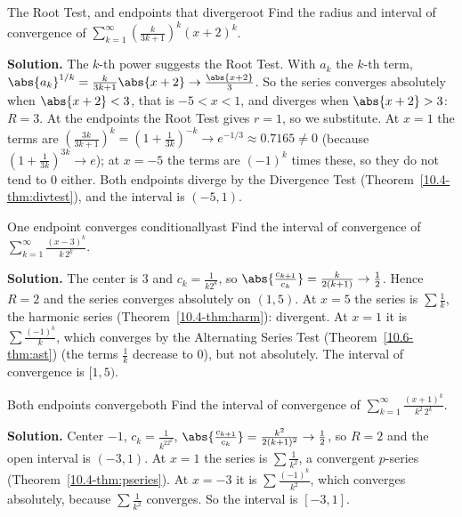 \documentclass[11pt]{article}
\begin{document}
\begin{exmp}{The Root Test, and endpoints that diverge}{root}
Find the radius and interval of convergence of $\displaystyle\sum_{k=1}^\infty\left(\frac k{3k+1}\right)^k(x+2)^k$.

\textbf{Solution.} The $k$-th power suggests the Root Test. With $a_k$ the $k$-th term, $\abs{a_k}^{1/k}=\frac k{3k+1}\abs{x+2}\to\frac{\abs{x+2}}3$.
So the series converges absolutely when $\abs{x+2}<3$, that is $-5<x<1$, and diverges when $\abs{x+2}>3$: $R=3$. At the endpoints the Root Test gives $r=1$, so we substitute. At $x=1$ the terms are $\left(\frac{3k}{3k+1}\right)^k=\left(1+\frac1{3k}\right)^{-k}\to e^{-1/3}\approx0.7165\ne0$ (because $\left(1+\frac1{3k}\right)^{3k}\to e$); at $x=-5$ the terms are $(-1)^k$ times these, so they do not tend to $0$ either. Both endpoints diverge by the Divergence Test (Theorem~\ref{10.4-thm:divtest}), and the interval is $(-5,1)$.
\end{exmp}

\begin{exmp}{One endpoint converges conditionally}{ast}
Find the interval of convergence of $\displaystyle\sum_{k=1}^\infty\frac{(x-3)^k}{k\,2^k}$.

\textbf{Solution.} The center is $3$ and $c_k=\frac1{k2^k}$, so $\abs{\frac{c_{k+1}}{c_k}}=\frac k{2(k+1)}\to\frac12$. Hence $R=2$ and the series converges absolutely on $(1,5)$. At $x=5$ the series is $\sum\frac1k$, the harmonic series (Theorem~\ref{10.4-thm:harm}): divergent. At $x=1$ it is $\sum\frac{(-1)^k}k$, which converges by the Alternating Series Test (Theorem~\ref{10.6-thm:ast}) (the terms $\frac1k$ decrease to $0$), but not absolutely. The interval of convergence is $[1,5)$.
\end{exmp}

\begin{exmp}{Both endpoints converge}{both}
Find the interval of convergence of $\displaystyle\sum_{k=1}^\infty\frac{(x+1)^k}{k^2\,2^k}$.

\textbf{Solution.} Center $-1$, $c_k=\frac1{k^22^k}$, $\abs{\frac{c_{k+1}}{c_k}}=\frac{k^2}{2(k+1)^2}\to\frac12$, so $R=2$ and the open interval is $(-3,1)$. At $x=1$ the series is $\sum\frac1{k^2}$, a convergent $p$-series (Theorem~\ref{10.4-thm:pseries}). At $x=-3$ it is $\sum\frac{(-1)^k}{k^2}$, which converges absolutely, because $\sum\frac1{k^2}$ converges. So the interval is $[-3,1]$.
\end{exmp}
\end{document}
